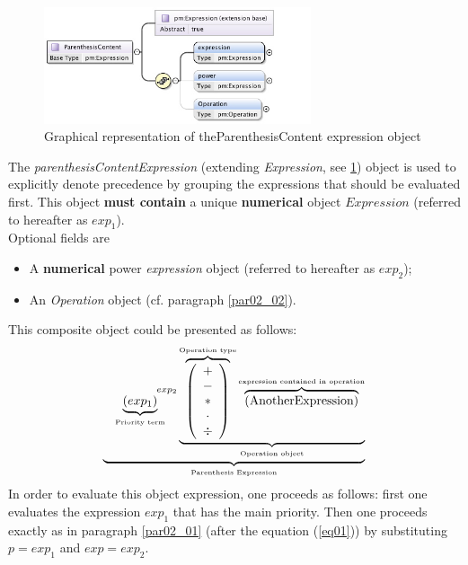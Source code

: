 \documentclass[a4paper,11pt] {ivoa}
\begin{document}
\begin{figure}[htbp]
\begin{center}
\includegraphics[width=0.7\textwidth]{pictures/ParenthesisContent.jpg} 
\caption{Graphical representation of theParenthesisContent expression object}
\label{Pic-ParenthesisContent}
\end{center}
\end{figure}

The {\it parenthesisContentExpression} (extending {\it Expression}, see
\ref{Pic-ParenthesisContent}) object is used to explicitly denote precedence by grouping the
expressions that should be evaluated first. This object {\bf must contain} a unique {\bf numerical}
object $Expression$ (referred to hereafter as $exp_1$).\\
Optional fields are 
\begin{itemize}
\item A {\bf numerical} power {\it expression} object (referred to hereafter as $exp_2$);
\item An {\it Operation} object (cf. paragraph \ref{par02_02}).\\
\end{itemize}
This composite object could be presented as follows:
\begin{equation}
 \underbrace{    \underbrace{ \left( exp_1\right) }_{\mbox{\tiny Priority term}} ^{\hspace{15mm}exp_2} \underbrace{  \overbrace{\left( \begin{array}{c} + \\ - \\ \ast  \\ \cdot \\ \div   \end{array} \right) }^{\mbox{\tiny Operation type}}
 \overbrace{    \left( \mbox{AnotherExpression}\right) }^{\mbox{\tiny expression contained in operation}}   }_{\mbox{\tiny Operation object}}}_{\mbox{\tiny Parenthesis Expression}}
\end{equation}
In order to evaluate this object expression, one proceeds as follows: first one evaluates the
expression $exp_1$ that has the main priority. Then one proceeds exactly as in paragraph
\ref{par02_01} (after the equation (\ref{eq01})) by substituting $p=exp_1$ and $exp=exp_2$.
\end{document}
